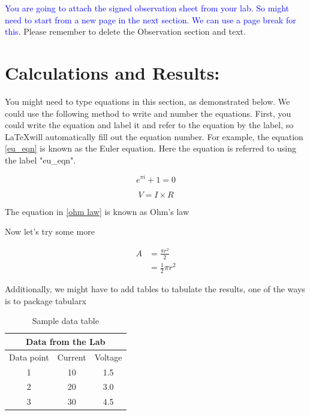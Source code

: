 \documentclass[11pt]{report}	%
\begin{document}
\textcolor{blue}{You are going to attach the signed observation sheet from your lab. So might need to start from a new page in the next section. We can use a page break for this.} Please remember to delete the Observation section and text.


\pagebreak
\section*{Calculations and Results:}

You might need to type equations in this section, as demonstrated below. We could use the following method to write and number the equations. First, you could write the equation and label it and refer to the equation by the label, so \LaTeX will automatically fill out the equation number. For example, the equation \ref{eu_eqn} is known as the Euler equation. Here the equation is referred to using the label "eu\_eqn".

\begin{equation} \label{eu_eqn}
e^{\pi i} + 1 = 0
\end{equation}

\begin{equation} \label{ohm law}
V=I \times R
\end{equation}

The equation in \ref{ohm law} is known as Ohm's law

Now let's try some more

\begin{equation} \label{eq1}
\begin{split}
A & = \frac{\pi r^2}{2} \\
& = \frac{1}{2} \pi r^2
\end{split}
\end{equation}

Additionally, we might have to add tables to tabulate the results, one of the ways is to package tabularx

\begin{table}[h]
\centering
\begin{tabular}{ |c|c|c|  }
 \hline
 \multicolumn{3}{|c|}{Data from the Lab} \\
 \hline
Data point & Current  & Voltage \\
 \hline
1 & 10 & 1.5\\
2 & 20 & 3.0\\
3 & 30 & 4.5\\
 \hline
\end{tabular}
\caption{Sample data table}
\end{table}
\end{document}
